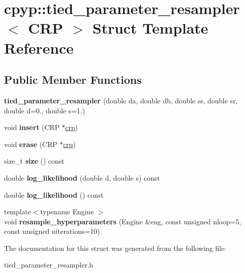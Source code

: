 \hypertarget{structcpyp_1_1tied__parameter__resampler}{}\section{cpyp\+:\+:tied\+\_\+parameter\+\_\+resampler$<$ C\+RP $>$ Struct Template Reference}
\label{structcpyp_1_1tied__parameter__resampler}
\subsection*{Public Member Functions}
\begin{DoxyCompactItemize}
\item 
\mbox{\label{structcpyp_1_1tied__parameter__resampler_a4946bd4b8ffd32347a60145784c4f68f}} 
{\bfseries tied\+\_\+parameter\+\_\+resampler} (double da, double db, double ss, double sr, double d=0., double s=1.)
\item 
\mbox{\label{structcpyp_1_1tied__parameter__resampler_abdbfcf9c749de11c2c9c5e142eb95b68}} 
void {\bfseries insert} (C\+RP $\ast$\mbox{\hyperlink{classcpyp_1_1crp}{crp}})
\item 
\mbox{\label{structcpyp_1_1tied__parameter__resampler_a6cff17a9e2b41cda54d8c981d29230de}} 
void {\bfseries erase} (C\+RP $\ast$\mbox{\hyperlink{classcpyp_1_1crp}{crp}})
\item 
\mbox{\label{structcpyp_1_1tied__parameter__resampler_a1432fb2c27862e1ace80bc0dd83c158c}} 
size\+\_\+t {\bfseries size} () const
\item 
\mbox{\label{structcpyp_1_1tied__parameter__resampler_a60f2775d17a18cad08683ebf8072fdfd}} 
double {\bfseries log\+\_\+likelihood} (double d, double s) const
\item 
\mbox{\label{structcpyp_1_1tied__parameter__resampler_ad0e9ac79b178e48f27f92ad36089aba5}} 
double {\bfseries log\+\_\+likelihood} () const
\item 
\mbox{\label{structcpyp_1_1tied__parameter__resampler_a540c37cb69e75063c842aa70c653007b}} 
{\footnotesize template$<$typename Engine $>$ }\\void {\bfseries resample\+\_\+hyperparameters} (Engine \&eng, const unsigned nloop=5, const unsigned niterations=10)
\end{DoxyCompactItemize}


The documentation for this struct was generated from the following file\+:\begin{DoxyCompactItemize}
\item 
tied\+\_\+parameter\+\_\+resampler.\+h\end{DoxyCompactItemize}
